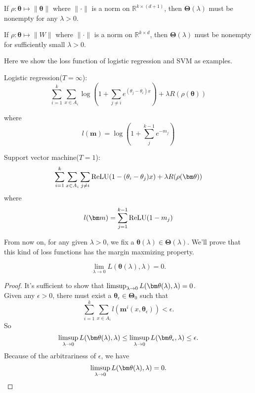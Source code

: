 \begin{lemma}
	If $\rho: \bm\theta \mapsto \|\bm\theta\|$ where $\|\cdot\|$ is a norm on $\mathbb{R}^{k\times (d+1)} $, then $\bm\Theta(\lambda)$ must be nonempty for any $\lambda > 0$.
\end{lemma}

\begin{lemma}
	If $\rho: \bm\theta \mapsto \|W\|$ where $\|\cdot\|$ is a norm on $\mathbb{R}^{k\times d} $, then $\bm\Theta(\lambda)$ must be nonempty for sufficiently small $\lambda > 0$.
\end{lemma}


Here we show the loss function of logistic regression and SVM as examples.

Logistic regression($T = \infty$):\\
\[
\sum_{i =  1}^{k} \sum_{x\in A_i} \log(1+\sum_{j\neq i} e^{(\theta_j - \theta_i) x}) + \lambda R(\rho(\bm\theta))
\]

where
\[
l(\bm m) = \log(1 + \sum_{j}^{k-1} e^{-m_j})
\]

\indent Support vector machine($T = 1$):\\
\[
\sum_{i =  1}^{k} \sum_{x\in A_i}\sum_{j\neq i} {\rm ReLU}(1 - (\theta_i - \theta_j) x) + \lambda R(\rho(\bm\theta))
\]
where 
\[
l(\bm m) = \sum_{j = 1}^{k-1} {\rm ReLU}(1 - m_j)
\]


From now on, for any given $\lambda > 0$, we fix a $\bm\theta(\lambda)\in \bm\Theta(\lambda)$. We'll prove that this kind of loss functions has the margin maxmizing property.



\begin{lemma}
	
	\begin{equation}
	\lim\limits_{\lambda\rightarrow 0} L(\bm\theta(\lambda),\lambda) = 0. 
	\end{equation}
\end{lemma}

\begin{proof}
    It's sufficient to show that $\mathop{\rm limsup}_{\lambda \rightarrow 0} L(\bm\theta(\lambda),\lambda) = 0$.\\
    Given any $\epsilon>0$, there must exist a $\bm\theta_{\epsilon}\in\bm\Theta_0$ such that
    \[
    \sum_{i =  1}^{k} \sum_{x\in A_i} l(\bm m^i(x,\bm  \theta_{\epsilon})) < \epsilon.
    \]
    So
    \begin{equation}
    	\mathop{\rm limsup}_{\lambda \rightarrow 0} L(\bm\theta(\lambda),\lambda) \leq \mathop{\rm limsup}_{\lambda \rightarrow 0} L(\bm\theta_\epsilon,\lambda) \leq \epsilon.
    \end{equation}
    Because of the arbitrariness of $\epsilon$, we have
    \[
    \mathop{\rm limsup}_{\lambda \rightarrow 0} L(\bm\theta(\lambda),\lambda) = 0.
    \]
\end{proof}


